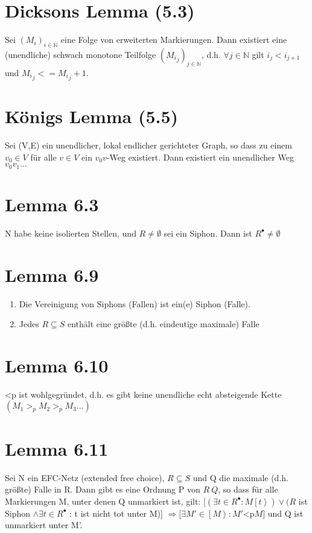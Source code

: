 \documentclass[12pt]{scrreprt}
\begin{document}
\section{Dicksons Lemma (5.3)}
Sei ${(M_i)}_{i \in \mathbb{N}}$ eine Folge von erweiterten Markierungen. Dann existiert eine (unendliche) schwach monotone Teilfolge $({M_i}_j)_{j \in \mathbb{N}}$, d.h. $\forall j \in \mathbb{N}$ gilt $i_j < i_{j+1}$ und ${M_i}_j <= {M_i}_j+1$.

\section{Königs Lemma (5.5)}
Sei (V,E) ein unendlicher, lokal endlicher gerichteter Graph, so dass zu einem $v_0 \in V$ für alle $v \in V$ ein $v_0 v$-Weg existiert. Dann existiert ein unendlicher Weg $v_0 v_1 ...$

\section{Lemma 6.3}
N habe keine isolierten Stellen, und $R \not = \emptyset$ sei ein Siphon. Dann ist $R^\bullet \not = \emptyset$

\section{Lemma 6.9}
\begin{enumerate}
	\item Die Vereinigung von Siphons (Fallen) ist ein(e) Siphon (Falle).
	\item Jedes $R \subseteq S$ enthält eine größte (d.h. eindeutige maximale) Falle
\end{enumerate}

\section{Lemma 6.10}
\ac{<p} ist wohlgegründet, d.h. es gibt keine unendliche echt absteigende Kette $(M_1 >_p M_2 >_p M_3 ...)$

\section{Lemma 6.11}
Sei N ein EFC-Netz (extended free choice), $R \subseteq S$ und Q die maximale (d.h. größte) Falle in R. Dann gibt es eine Ordnung P von $R \ Q$, so dass für alle Markierungen M, unter denen Q unmarkiert ist, gilt:\newline
$[(\exists t \in R^\bullet : M\left[t\right>) \vee (R$ ist Siphon $\wedge \exists t \in R^\bullet$ : t ist nicht tot unter M)] $\Rightarrow [ \exists M' \in \left[M\right> : M' $\ac{<p}$M]$ und Q ist unmarkiert unter M'.
\end{document}
